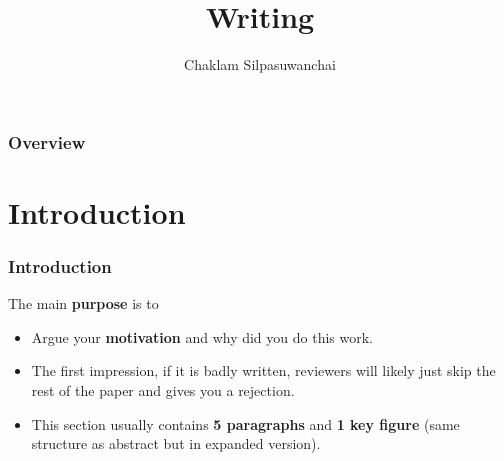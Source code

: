\documentclass{beamer}
\title[Writing]{Writing} %
\author{Chaklam Silpasuwanchai} %
\institute[AIT] %
{
Asian Institute of Technology \\ %
\medskip
\textit{chaklam@ait.asia} %
}
\date{} %
\begin{document}
\begin{frame}
\titlepage %
\end{frame}

\begin{frame}
\frametitle{Overview} %
\tableofcontents %
\end{frame}



\section{Introduction}

\begin{frame}
\frametitle{Introduction} 
 The main \textbf{purpose} is to
\begin{itemize}
	\item Argue your \textbf{motivation} and why did you do this work.
	\item The first impression, if it is badly written, reviewers will likely just skip the rest of the paper and gives you a rejection.  
	\item This section usually contains \textbf{5 paragraphs} and \textbf{1 key figure}  (same structure as abstract but in expanded version).
\end{itemize}
\end{frame}
\end{document}
